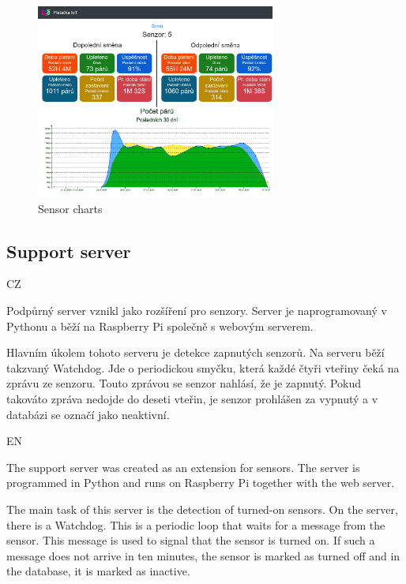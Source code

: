 \documentclass[12pt, a4paper]{article}
\begin{document}
\begin{figure}[t]
    \centering
    \includegraphics[width=0.7\textwidth]{img/prehled.png}
    \caption{Sensor charts}
    \label{fig:webSenzory}
\end{figure}


\subsection*{Support server}

CZ

Podpůrný server vznikl jako rozšíření pro senzory.
Server je naprogramovaný v Pythonu a běží na Raspberry Pi společně s webovým serverem.\newline

Hlavním úkolem tohoto serveru je detekce zapnutých senzorů.
Na serveru běží takzvaný Watchdog.
Jde o periodickou smyčku, která každé čtyři vteřiny čeká na zprávu ze senzoru.
Touto zprávou se senzor nahlásí, že je zapnutý. Pokud takováto zpráva nedojde do deseti vteřin, je senzor prohlášen za vypnutý a v databázi se označí jako neaktivní.

EN

The support server was created as an extension for sensors.
The server is programmed in Python and runs on Raspberry Pi together with the web server.\newline

The main task of this server is the detection of turned-on sensors.
On the server, there is a Watchdog.
This is a periodic loop that waits for a message from the sensor.
This message is used to signal that the sensor is turned on.
If such a message does not arrive in ten minutes, the sensor is marked as turned off and in the database, it is marked as inactive.
\end{document}

